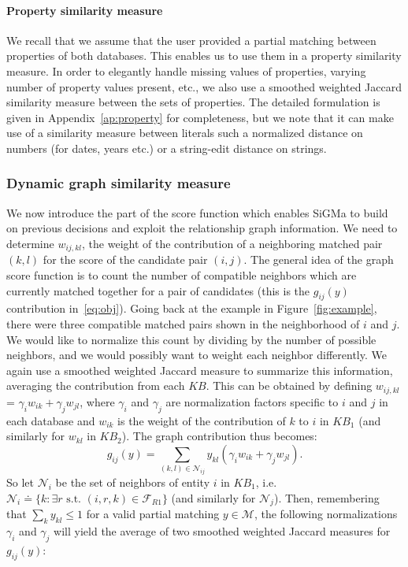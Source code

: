 \documentclass{sig-alternate}
\newcommand{\KB}{K\!B}
\begin{document}
\paragraph*{Property similarity measure} We recall that we assume that the user provided a partial matching between properties of both databases. This enables us to use them in a property similarity measure. In order to elegantly handle missing values of properties, varying number of property values present, etc., we also use a smoothed weighted Jaccard similarity measure between the sets of properties. The detailed formulation is given in Appendix~\ref{ap:property} for completeness, but we note that it can make use of a similarity measure between literals such a normalized distance on numbers (for dates, years etc.) or a string-edit distance on strings.

\subsubsection{Dynamic graph similarity measure}
We now introduce the part of the score function which enables \textsf{SiGMa} to build on previous decisions and exploit the relationship graph information. We need to determine $w_{ij,kl}$, the weight of the contribution of a neighboring matched pair $(k,l)$ for the score of the candidate pair $(i,j)$. The general idea of the graph score function is to count the number of compatible neighbors which are currently matched together for a pair of candidates (this is the $g_{ij}(y)$ contribution in~\eqref{eq:obj}). Going back at the example in Figure~\ref{fig:example}, there were three compatible matched pairs shown in the neighborhood of $i$ and $j$. We would like to normalize this count by dividing by the number of possible neighbors, and we would possibly want to weight each neighbor differently. We again use a smoothed weighted Jaccard measure to summarize this information, averaging the contribution from each $\KB$. This can be obtained by defining $w_{ij,kl}$ = $\gamma_{i} w_{ik} + \gamma_{j} w_{jl}$, where $\gamma_i$ and $\gamma_j$ are normalization factors specific to $i$ and $j$ in each database and $w_{ik}$ is the weight of the contribution of $k$ to $i$ in $\KB_1$ (and similarly for $w_{kl}$ in $\KB_2$). The graph contribution thus becomes:
\begin{equation} \label{eq:g_ij}
    g_{ij}(y) = \sum_{(k,l) \in \mathcal{N}_{ij}} y_{kl}  (\gamma_i w_{ik} + \gamma_j w_{jl}).
\end{equation}
So let $\mathcal{N}_{i}$ be the set of neighbors of entity $i$ in $\KB_1$, i.e. $\mathcal{N}_{i} \doteq \{ k : \exists r \textrm{ s.t. } (i,r,k) \in \mathcal{F}_{R1} \}$ (and similarly for $\mathcal{N}_j$). Then, remembering that $\sum_{k} y_{kl} \leq 1$ for a valid partial matching $y \in \mathcal{M}$, the following normalizations $\gamma_i$ and $\gamma_j$ will yield the average of two smoothed weighted Jaccard measures for $g_{ij}(y)$:
\end{document}
